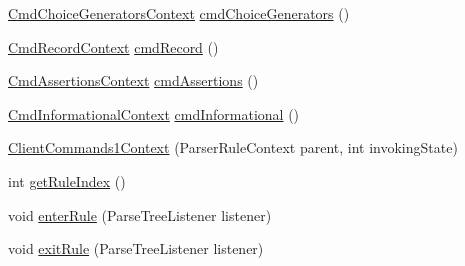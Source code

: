\begin{DoxyCompactItemize}
\item 
\hyperlink{classgov_1_1nasa_1_1jpf_1_1inspector_1_1client_1_1parser_1_1_console_grammar_parser_1_1_cmd_choice_generators_context}{Cmd\+Choice\+Generators\+Context} \hyperlink{classgov_1_1nasa_1_1jpf_1_1inspector_1_1client_1_1parser_1_1_console_grammar_parser_1_1_client_commands1_context_a6be1ff7eb80e0e72b3465c57c4590cd8}{cmd\+Choice\+Generators} ()
\item 
\hyperlink{classgov_1_1nasa_1_1jpf_1_1inspector_1_1client_1_1parser_1_1_console_grammar_parser_1_1_cmd_record_context}{Cmd\+Record\+Context} \hyperlink{classgov_1_1nasa_1_1jpf_1_1inspector_1_1client_1_1parser_1_1_console_grammar_parser_1_1_client_commands1_context_a3702d93b12dbf927e65c6fa12bab11d5}{cmd\+Record} ()
\item 
\hyperlink{classgov_1_1nasa_1_1jpf_1_1inspector_1_1client_1_1parser_1_1_console_grammar_parser_1_1_cmd_assertions_context}{Cmd\+Assertions\+Context} \hyperlink{classgov_1_1nasa_1_1jpf_1_1inspector_1_1client_1_1parser_1_1_console_grammar_parser_1_1_client_commands1_context_a84a68f1e6a35efdfd4180b23f2b6defe}{cmd\+Assertions} ()
\item 
\hyperlink{classgov_1_1nasa_1_1jpf_1_1inspector_1_1client_1_1parser_1_1_console_grammar_parser_1_1_cmd_informational_context}{Cmd\+Informational\+Context} \hyperlink{classgov_1_1nasa_1_1jpf_1_1inspector_1_1client_1_1parser_1_1_console_grammar_parser_1_1_client_commands1_context_a0f1497f0df870614652683546b2519f5}{cmd\+Informational} ()
\item 
\hyperlink{classgov_1_1nasa_1_1jpf_1_1inspector_1_1client_1_1parser_1_1_console_grammar_parser_1_1_client_commands1_context_a57be258989c12d4932087bdb17a3920d}{Client\+Commands1\+Context} (Parser\+Rule\+Context parent, int invoking\+State)
\item 
int \hyperlink{classgov_1_1nasa_1_1jpf_1_1inspector_1_1client_1_1parser_1_1_console_grammar_parser_1_1_client_commands1_context_aa5e0d2e278ed625c8995b7aac039d8a1}{get\+Rule\+Index} ()
\item 
void \hyperlink{classgov_1_1nasa_1_1jpf_1_1inspector_1_1client_1_1parser_1_1_console_grammar_parser_1_1_client_commands1_context_a7ca8c297cb1fa7adbe3e268c02e1d488}{enter\+Rule} (Parse\+Tree\+Listener listener)
\item 
void \hyperlink{classgov_1_1nasa_1_1jpf_1_1inspector_1_1client_1_1parser_1_1_console_grammar_parser_1_1_client_commands1_context_a704fa20703b7bddd074b08641d3519f0}{exit\+Rule} (Parse\+Tree\+Listener listener)
\end{DoxyCompactItemize}
